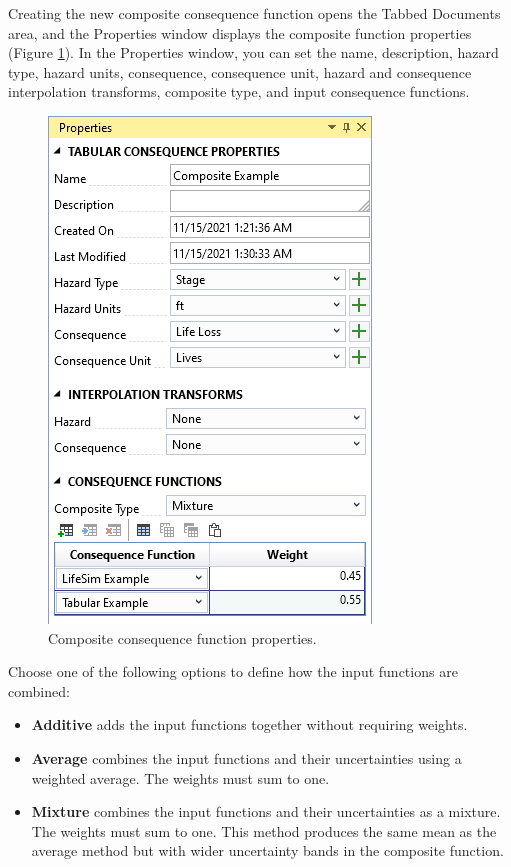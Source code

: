 \documentclass[
]{book}
\begin{document}
Creating the new composite consequence function opens the Tabbed Documents area, and the Properties window displays the composite function properties (Figure \ref{fig:figure-121}). In the Properties window, you can set the name, description, hazard type, hazard units, consequence, consequence unit, hazard and consequence interpolation transforms, composite type, and input consequence functions.

\begin{figure}

{\centering \includegraphics{images/figure121} 

}

\caption{Composite consequence function properties.}\label{fig:figure-121}
\end{figure}

Choose one of the following options to define how the input functions are combined:

\begin{itemize}
\item
  \textbf{Additive} adds the input functions together without requiring weights.
\item
  \textbf{Average} combines the input functions and their uncertainties using a weighted average. The weights must sum to one.
\item
  \textbf{Mixture} combines the input functions and their uncertainties as a mixture. The weights must sum to one. This method produces the same mean as the average method but with wider uncertainty bands in the composite function.
\end{itemize}
\end{document}

